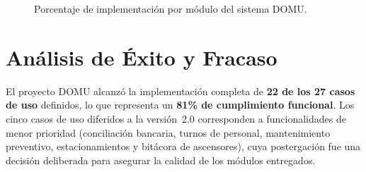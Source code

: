 %
%
%
%
\begin{figure}[H]
  \centering
  \caption{Porcentaje de implementación por módulo del sistema DOMU.}
  \label{fig:cumplimiento-modulos}
\end{figure}

\section{Análisis de Éxito y Fracaso}

El proyecto DOMU alcanzó la implementación completa de \textbf{22 de los 27 casos de uso} definidos, lo que representa un \textbf{81\% de cumplimiento funcional}. Los cinco casos de uso diferidos a la versión~2.0 corresponden a funcionalidades de menor prioridad (conciliación bancaria, turnos de personal, mantenimiento preventivo, estacionamientos y bitácora de ascensores), cuya postergación fue una decisión deliberada para asegurar la calidad de los módulos entregados.

